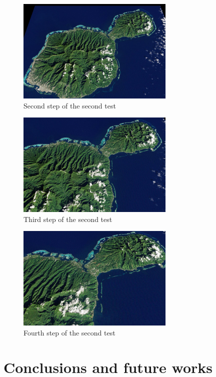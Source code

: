 \documentclass[english,12pt,a4paper,pdftex,elec,utf8]{aaltothesis}
\begin{document}
\begin{figure}[htb]
\centering \includegraphics[height=5cm]{screenshot1.jpg}
\caption{Second step of the second test\label{screenshot1Test2}}
\end{figure}

\begin{figure}[htb]
\centering \includegraphics[height=5cm]{screenshot2.jpg}
\caption{Third step of the second test\label{screenshot2Test2}}
\end{figure}

\begin{figure}[htb]
\centering \includegraphics[height=5cm]{screenshot3.jpg}
\caption{Fourth step of the second test\label{screenshot3Test2}}
\end{figure}

\clearpage

\section{Conclusions and future works} 
\end{document}

